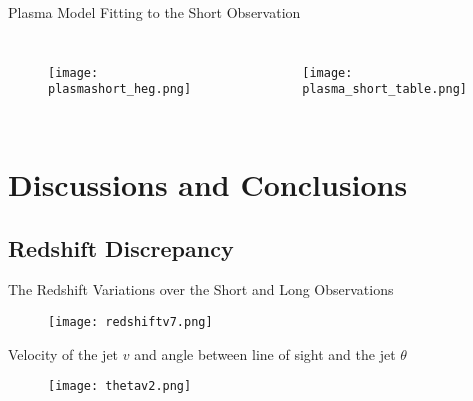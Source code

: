 \documentclass{beamer}
\begin{document}
\begin{frame}{Plasma Model Fitting to the Short Observation}
      \begin{columns}
            \begin{figure}
                \centering
                \texttt{[image: plasmashort\_heg.png]}
                \label{plasmashort}       
                \end{figure}
    \pause
            \begin{figure}
                \centering
                \texttt{[image: plasma\_short\_table.png]}
                \label{plasmashort}               
                \end{figure}
          \end{columns} 
        

\end{frame}

\section{Discussions and Conclusions}

\subsection{Redshift Discrepancy}
\begin{frame}{The Redshift Variations over the Short and Long Observations}
    \begin{figure}
        \centering
        \texttt{[image: redshiftv7.png]}
        \label{redshiftschange}
    \end{figure}
\end{frame}


\begin{frame}{Velocity of the jet $v$ and angle between line of sight and the jet $\theta$}

\begin{figure}
    \centering
    \texttt{[image: thetav2.png]}
    \label{thetav}
\end{figure}
    
\end{frame}
\end{document}

